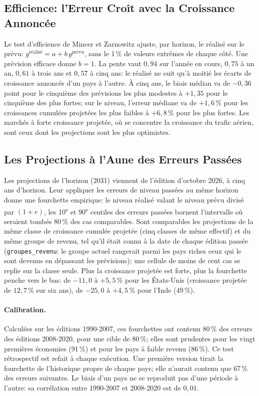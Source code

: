 \documentclass[11pt,a4paper]{article}
\begin{document}
\subsection{Efficience: l'Erreur Croît avec la Croissance Annoncée}
Le test d'efficience de Mincer et Zarnowitz ajuste, par horizon, le réalisé sur le prévu: $g^{\text{réalisé}} = a + b\,g^{\text{prévu}}$, sans le 1\,\% de valeurs extrêmes de chaque côté. Une prévision efficace donne $b = 1$. La pente vaut $0{,}94$ sur l'année en cours, $0{,}75$ à un an, $0{,}61$ à trois ans et $0{,}57$ à cinq ans: le réalisé ne suit qu'à moitié les écarts de croissance annoncés d'un pays à l'autre. À cinq ans, le biais médian va de $-0{,}36$ point pour le cinquième des prévisions les plus modestes à $+1{,}35$ pour le cinquième des plus fortes; sur le niveau, l'erreur médiane va de $+1{,}6\,\%$ pour les croissances cumulées projetées les plus faibles à $+6{,}8\,\%$ pour les plus fortes. Les marchés à forte croissance projetée, où se concentre la croissance du trafic aérien, sont ceux dont les projections sont les plus optimistes.

\subsection{Les Projections à l'Aune des Erreurs Passées}
Les projections de l'horizon (2031) viennent de l'édition d'octobre 2026, à cinq ans d'horizon. Leur appliquer les erreurs de niveau passées au même horizon donne une fourchette empirique: le niveau réalisé valant le niveau prévu divisé par $(1 + e)$, les 10\textsuperscript{e} et 90\textsuperscript{e} centiles des erreurs passées bornent l'intervalle où seraient tombés 80\,\% des cas comparables. Sont comparables les projections de la même classe de croissance cumulée projetée (cinq classes de même effectif) et du même groupe de revenu, tel qu'il était connu à la date de chaque édition passée (\texttt{groupes\_revenu}: le groupe actuel rangerait parmi les pays riches ceux qui le sont devenus en dépassant les prévisions); une cellule de moins de cent cas se replie sur la classe seule. Plus la croissance projetée est forte, plus la fourchette penche vers le bas: de $-11{,}0$ à $+5{,}5\,\%$ pour les États-Unis (croissance projetée de $12{,}7\,\%$ sur six ans), de $-25{,}0$ à $+4{,}5\,\%$ pour l'Inde ($49\,\%$).

\paragraph{Calibration.} Calculées sur les éditions 1990-2007, ces fourchettes ont contenu 80\,\% des erreurs des éditions 2008-2020, pour une cible de 80\,\%; elles sont prudentes pour les vingt premières économies (91\,\%) et pour les pays à faible revenu (86\,\%). Ce test rétrospectif est refait à chaque exécution. Une première version tirait la fourchette de l'historique propre de chaque pays; elle n'aurait contenu que 67\,\% des erreurs suivantes. Le biais d'un pays ne se reproduit pas d'une période à l'autre: sa corrélation entre 1990-2007 et 2008-2020 est de $0{,}01$.
\end{document}
